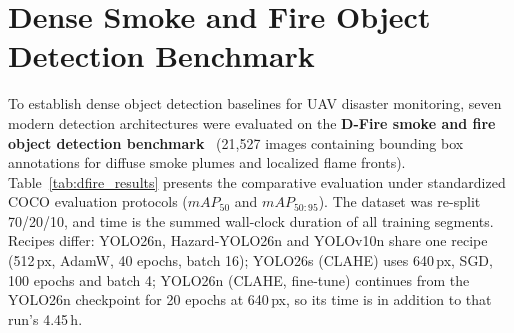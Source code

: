 
\section{Dense Smoke and Fire Object Detection Benchmark}
\label{sec:object_detection}

To establish dense object detection baselines for UAV disaster monitoring, seven modern detection architectures were evaluated on the \textbf{D-Fire smoke and fire object detection benchmark}~\cite{dfire2022} (21{,}527 images containing bounding box annotations for diffuse smoke plumes and localized flame fronts). Table~\ref{tab:dfire_results} presents the comparative evaluation under standardized COCO evaluation protocols ($mAP_{50}$ and $mAP_{50:95}$). The dataset was re-split 70/20/10, and time is the summed wall-clock duration of all training segments. Recipes differ: YOLO26n, Hazard-YOLO26n and YOLOv10n share one recipe (512\,px, AdamW, 40 epochs, batch 16); YOLO26s (CLAHE) uses 640\,px, SGD, 100 epochs and batch 4; YOLO26n (CLAHE, fine-tune) continues from the YOLO26n checkpoint for 20 epochs at 640\,px, so its time is in addition to that run's 4.45\,h.

\begin{table}[H]
\centering
\caption[Smoke and fire detection on D-Fire]{Smoke and fire detection on D-Fire (2{,}153-image test split of our 70/20/10 re-split). Time: total training wall-clock. Best per column in bold.}
\label{tab:dfire_results}
\end{table}

